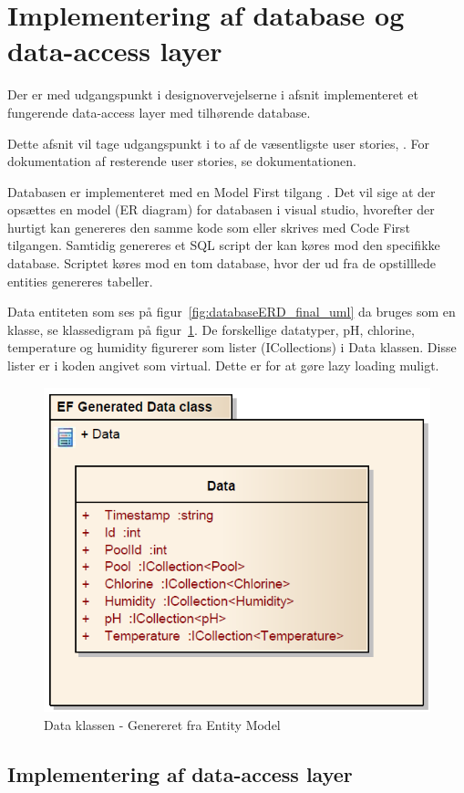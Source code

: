 \section{Implementering af database og data-access layer}


Der er med udgangspunkt i designovervejelserne i afsnit  implementeret et fungerende data-access layer med tilhørende database.

Dette afsnit vil tage udgangspunkt i to af de væsentligste user stories, . For dokumentation af resterende user stories, se dokumentationen.

Databasen er implementeret med en Model First tilgang . Det vil sige at der opsættes en model (ER diagram) for databasen i visual studio, hvorefter der hurtigt kan genereres den samme kode som eller skrives med Code First  tilgangen. Samtidig genereres et SQL script der kan køres mod den specifikke database. Scriptet køres mod en tom database, hvor der ud fra de opstilllede entities genereres tabeller.

Data entiteten som ses på figur~\ref{fig:databaseERD_final_uml} da bruges som en klasse, se klassedigram på figur~\ref{fig:efGeneratedData}. De forskellige datatyper, pH, chlorine, temperature og humidity figurerer som lister (ICollections) i Data klassen. Disse lister er i koden angivet som virtual. Dette er for at gøre lazy loading muligt.

\begin{figure}
\centering
\includegraphics[width=0.5\linewidth]{figs/implementering/efGeneratedData.PNG}
\caption{Data klassen - Genereret fra Entity Model}
\label{fig:efGeneratedData}
\end{figure}


\subsection{Implementering af data-access layer}


